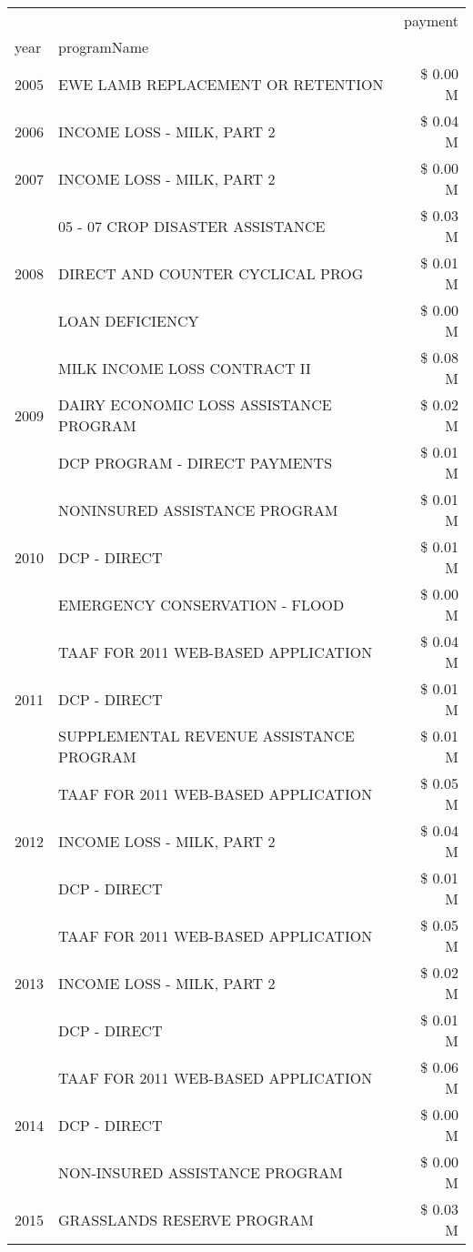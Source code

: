 \begin{tabular}{llr}
\toprule
 &  & payment \\
year & programName &  \\
\midrule
2005 & EWE LAMB REPLACEMENT OR RETENTION & \$ 0.00 M \\
\cline{1-3}
2006 & INCOME LOSS - MILK, PART 2 & \$ 0.04 M \\
\cline{1-3}
2007 & INCOME LOSS - MILK, PART 2 & \$ 0.00 M \\
\cline{1-3}
\multirow[t]{3}{*}{2008} & 05 - 07 CROP DISASTER ASSISTANCE & \$ 0.03 M \\
 & DIRECT AND COUNTER CYCLICAL PROG & \$ 0.01 M \\
 & LOAN DEFICIENCY & \$ 0.00 M \\
\cline{1-3}
\multirow[t]{3}{*}{2009} & MILK INCOME LOSS CONTRACT II & \$ 0.08 M \\
 & DAIRY ECONOMIC LOSS ASSISTANCE PROGRAM & \$ 0.02 M \\
 & DCP PROGRAM - DIRECT PAYMENTS & \$ 0.01 M \\
\cline{1-3}
\multirow[t]{3}{*}{2010} & NONINSURED ASSISTANCE PROGRAM & \$ 0.01 M \\
 & DCP - DIRECT & \$ 0.01 M \\
 & EMERGENCY CONSERVATION - FLOOD & \$ 0.00 M \\
\cline{1-3}
\multirow[t]{3}{*}{2011} & TAAF FOR 2011 WEB-BASED APPLICATION & \$ 0.04 M \\
 & DCP - DIRECT & \$ 0.01 M \\
 & SUPPLEMENTAL REVENUE ASSISTANCE PROGRAM & \$ 0.01 M \\
\cline{1-3}
\multirow[t]{3}{*}{2012} & TAAF FOR 2011 WEB-BASED APPLICATION & \$ 0.05 M \\
 & INCOME LOSS - MILK, PART 2 & \$ 0.04 M \\
 & DCP - DIRECT & \$ 0.01 M \\
\cline{1-3}
\multirow[t]{3}{*}{2013} & TAAF FOR 2011 WEB-BASED APPLICATION & \$ 0.05 M \\
 & INCOME LOSS - MILK, PART 2 & \$ 0.02 M \\
 & DCP - DIRECT & \$ 0.01 M \\
\cline{1-3}
\multirow[t]{3}{*}{2014} & TAAF FOR 2011 WEB-BASED APPLICATION & \$ 0.06 M \\
 & DCP - DIRECT & \$ 0.00 M \\
 & NON-INSURED ASSISTANCE PROGRAM & \$ 0.00 M \\
\cline{1-3}
\multirow[t]{3}{*}{2015} & GRASSLANDS RESERVE PROGRAM & \$ 0.03 M \\

\end{tabular}
